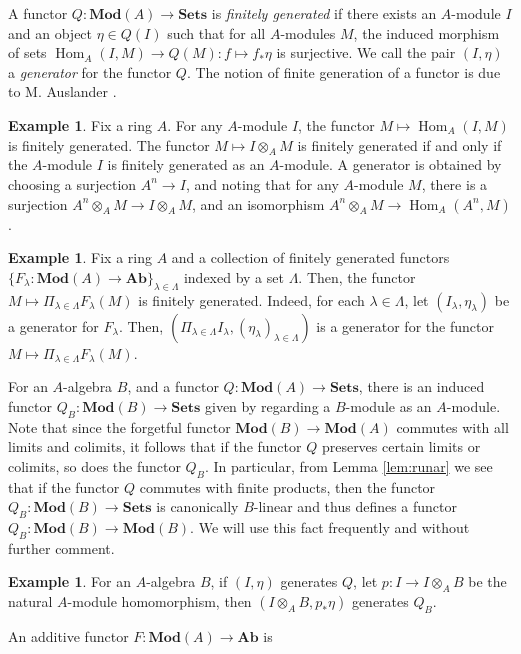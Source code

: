 \documentclass{amsart}
\theoremstyle{plain}
\theoremstyle{definition}
\newtheorem{ex}[thm]{Example}
\theoremstyle{remark}
\numberwithin{equation}{section}
\newcommand{\MOD}[1]{\mathbf{Mod}({#1})}
\DeclareMathOperator{\Hom}{Hom}
\newcommand{\tensor}{\otimes}
\newcommand{\AB}{\mathbf{Ab}}
\newcommand{\SETS}{\mathbf{Sets}}
\newcommand{\fndefn}[1]{\emph{{#1}}}
\begin{document}
A functor $Q : \MOD{A} \to \SETS$ is \fndefn{finitely generated} if
there exists an $A$-module $I$ and an object $\eta \in Q(I)$ such
that for all $A$-modules $M$, the induced morphism of sets
$\Hom_A(I,M) \to Q(M) : f\mapsto f_*\eta$ is surjective. We 
call the pair $(I,\eta)$ a \fndefn{generator} for the functor $Q$. The
notion of finite 
generation of a functor is due to M. Auslander \cite{MR0212070}.
\begin{ex}
  Fix a ring $A$. For any $A$-module $I$, the functor $M\mapsto
  \Hom_A(I,M)$ is finitely generated. The functor $M\mapsto I\tensor_A
  M$ is finitely generated if and only if the $A$-module $I$ is
  finitely generated as an $A$-module.  A generator is obtained by
  choosing a surjection $A^n \to I$, and noting that for any
  $A$-module $M$, there is a surjection $A^n\tensor_A M \to I\tensor_A
  M$, and an isomorphism $A^n \tensor_A M \to \Hom_A(A^n,M)$. 
\end{ex}
\begin{ex}\label{ex:fg_prod}
  Fix a ring $A$ and a collection of finitely generated functors
  $\{F_\lambda : \MOD{A} \to \AB\}_{\lambda\in \Lambda}$ indexed by a
  set $\Lambda$. Then, the functor $M \mapsto \Pi_{\lambda\in
    \Lambda} F_\lambda(M)$ is finitely generated. Indeed, for each
  $\lambda\in \Lambda$, let  $(I_\lambda,\eta_\lambda)$ be a generator
  for $F_\lambda$. Then, $(\Pi_{\lambda\in \Lambda} I_\lambda,
  (\eta_\lambda)_{\lambda\in \Lambda})$ is a generator for the functor
  $M\mapsto \Pi_{\lambda \in \Lambda} F_\lambda(M)$. 
\end{ex}
For an $A$-algebra $B$, and a functor $Q : \MOD{A}
\to \SETS$, there is an induced functor $Q_B : \MOD{B} \to \SETS$
given by regarding a $B$-module as an $A$-module. Note that since the
forgetful functor $\MOD{B} \to \MOD{A}$ commutes with all limits and
colimits, it follows that if the functor $Q$ preserves certain limits
or colimits, so does 
the functor $Q_B$. In particular, from Lemma \ref{lem:runar} we see
that if the functor $Q$ commutes with finite products, then the
functor $Q_B : \MOD{B} \to \SETS$ is canonically $B$-linear and thus
defines a functor $Q_B : \MOD{B} \to \MOD{B}$. We will use this
fact frequently and without further comment. 
\begin{ex}\label{ex:fg_rest}
  For an $A$-algebra $B$, if $(I,\eta)$ generates $Q$, let $p : I \to
  I\tensor_A B$ be the natural $A$-module homomorphism, then
  $(I\tensor_A B, p_*\eta)$ generates $Q_B$.
\end{ex}
An additive functor $F:\MOD{A} \to \AB$ is
\end{document}

